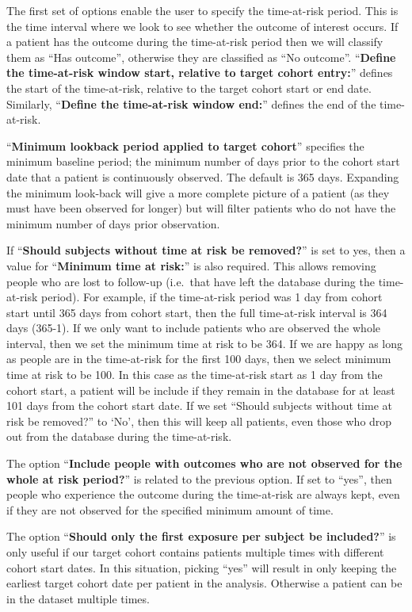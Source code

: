 \documentclass[11pt]{book}
\theoremstyle{definition}
\theoremstyle{definition}
\theoremstyle{definition}
\theoremstyle{remark}
\begin{document}
The first set of options enable the user to specify the time-at-risk period. This is the time interval where we look to see whether the outcome of interest occurs. If a patient has the outcome during the time-at-risk period then we will classify them as ``Has outcome'', otherwise they are classified as ``No outcome''. ``\textbf{Define the time-at-risk window start, relative to target cohort entry:}'' defines the start of the time-at-risk, relative to the target cohort start or end date. Similarly, ``\textbf{Define the time-at-risk window end:}'' defines the end of the time-at-risk.

``\textbf{Minimum lookback period applied to target cohort}'' specifies the minimum baseline period; the minimum number of days prior to the cohort start date that a patient is continuously observed. The default is 365 days. Expanding the minimum look-back will give a more complete picture of a patient (as they must have been observed for longer) but will filter patients who do not have the minimum number of days prior observation.

If ``\textbf{Should subjects without time at risk be removed?}'' is set to yes, then a value for ``\textbf{Minimum time at risk:}'' is also required. This allows removing people who are lost to follow-up (i.e.~that have left the database during the time-at-risk period). For example, if the time-at-risk period was 1 day from cohort start until 365 days from cohort start, then the full time-at-risk interval is 364 days (365-1). If we only want to include patients who are observed the whole interval, then we set the minimum time at risk to be 364. If we are happy as long as people are in the time-at-risk for the first 100 days, then we select minimum time at risk to be 100. In this case as the time-at-risk start as 1 day from the cohort start, a patient will be include if they remain in the database for at least 101 days from the cohort start date. If we set ``Should subjects without time at risk be removed?'' to `No', then this will keep all patients, even those who drop out from the database during the time-at-risk.

The option ``\textbf{Include people with outcomes who are not observed for the whole at risk period?}'' is related to the previous option. If set to ``yes'', then people who experience the outcome during the time-at-risk are always kept, even if they are not observed for the specified minimum amount of time.

The option ``\textbf{Should only the first exposure per subject be included?}'' is only useful if our target cohort contains patients multiple times with different cohort start dates. In this situation, picking ``yes'' will result in only keeping the earliest target cohort date per patient in the analysis. Otherwise a patient can be in the dataset multiple times.
\end{document}
